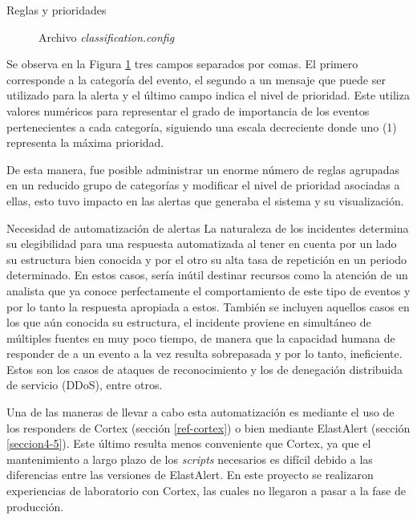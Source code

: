 \begin{section}{Reglas y prioridades}
\begin{figure}[H]
    \caption{Archivo \textit{classification.config}}
    \label{fig:figura_43_classf_config}
    \end{figure}
    \FloatBarrier
    Se observa en la Figura \ref{fig:figura_43_classf_config} tres campos separados por comas. El primero corresponde a la categoría del evento, el segundo a un mensaje que puede ser utilizado para la alerta y el último campo indica el nivel de prioridad. Este utiliza valores numéricos para representar el grado de importancia de los eventos pertenecientes a cada categoría, siguiendo una escala decreciente donde uno (1) representa la máxima prioridad. \par
    De esta manera, fue posible administrar un enorme número de reglas agrupadas en un reducido grupo de categorías y modificar el nivel de prioridad asociadas a ellas, esto tuvo impacto en las alertas que generaba el sistema y su visualización. \par
    \begin{subsection}{Necesidad de automatización de alertas}
    La naturaleza de los incidentes determina su elegibilidad para una respuesta automatizada al tener en cuenta por un lado su estructura bien conocida y por el otro su alta tasa de repetición en un periodo determinado. En estos casos, sería inútil destinar recursos como la atención de un analista que ya conoce perfectamente el comportamiento de este tipo de eventos y por lo tanto la respuesta apropiada a estos. También se incluyen aquellos casos en los que aún conocida su estructura, el incidente proviene en simultáneo de múltiples fuentes en muy poco tiempo, de manera que la capacidad humana de responder de a un evento a la vez resulta sobrepasada y por lo tanto, ineficiente. Estos son los casos de ataques de reconocimiento y los de denegación distribuida de servicio (DDoS), entre otros. \par
    Una de las maneras de llevar a cabo esta automatización es mediante el uso de los responders de Cortex (sección \ref{ref-cortex}) o bien mediante ElastAlert (sección \ref{seccion4-5}). Este último resulta menos conveniente que Cortex, ya que el mantenimiento a largo plazo de los \textit{scripts} necesarios es difícil debido a las diferencias entre las versiones de ElastAlert. En este proyecto se realizaron experiencias de laboratorio con Cortex, las cuales no llegaron a pasar a la fase de producción. 
    \end{subsection}

    \end{section}

